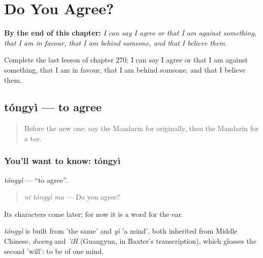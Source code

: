 
\chapter{Do You Agree?}
\label{ch:zh-do-you-agree}

\begin{chapteropening}
\textbf{By the end of this chapter:} \emph{I can say I agree or that I am against something, that I am in favour, that I am behind someone, and that I believe them.}

Complete the last lesson of chapter 270: I can say I agree or that I am against something, that I am in favour, that I am behind someone, and that I believe them.
\end{chapteropening}

\section[tóngyì]{tóngyì — to agree}

\label{lesson:ZH-C270-tongyi}



\begin{quote}
Before the new one: say the Mandarin for originally, then the Mandarin for a toy.
\end{quote}

\subsection*{You'll want to know: tóngyì}
\emph{tóngyì} — \textquotedblleft{}to agree\textquotedblright{}.

\begin{quote}
\emph{nǐ tóngyì ma} — Do you agree?
\end{quote}

Its characters come later; for now it is a word for the ear.

\begin{cousinweb}
\emph{tóngyì} is built from  'the same' and \emph{yì} 'a mind', both inherited from Middle Chinese, \emph{duwng} and \emph{'iH} (Guangyun, in Baxter's transcription), which glosses the second 'will': to be of one mind.
\end{cousinweb}

